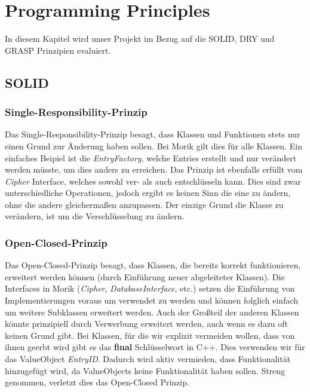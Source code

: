 \chapter{Programming Principles}

In diesem Kapitel wird unser Projekt im Bezug auf die SOLID, DRY und GRASP Prinzipien evaluiert.

\section{SOLID}

\subsection{Single-Responsibility-Prinzip}

Das Single-Responsibility-Prinzip besagt, dass Klassen und Funktionen stets nur einen Grund zur Änderung haben sollen. Bei Morik gilt dies für alle Klassen. Ein einfaches Beipiel ist die \textit{EntryFactory}, welche Entries erstellt und nur verändert werden müsste, um dies anders zu erreichen. Das Prinzip ist ebenfalls erfüllt vom \textit{Cipher} Interface, welches sowohl ver- als auch entschlüsseln kann. Dies sind zwar unterschiedliche Operationen, jedoch ergibt es keinen Sinn die eine zu ändern, ohne die andere gleichermaßen anzupassen. Der einzige Grund die Klasse zu verändern, ist um die Verschlüsselung zu ändern.

\subsection{Open-Closed-Prinzip}

Das Open-Closed-Prinzip besagt, dass Klassen, die bereits korrekt funktionieren, erweitert werden können (durch Einführung neuer abgeleiteter Klassen). 
Die Interfaces in Morik (\textit{Cipher}, \textit{DatabaseInterface}, etc.) setzen die Einführung von Implementierungen voraus um verwendet zu werden und können folglich einfach um weitere Subklassen erweitert werden. Auch der Großteil der anderen Klassen könnte prinzipiell durch Verwerbung erweitert werden, auch wenn es dazu oft keinen Grund gibt. Bei Klassen, für die wir explizit vermeiden wollen, dass von ihnen geerbt wird gibt es das \textbf{final} Schlüsselwort in C++. Dies verwenden wir \zB für das ValueObject \textit{EntryID}. Dadurch wird aktiv vermieden, dass Funktionalität hinzugefügt wird, da ValueObjects keine Funktionalität haben sollen. Streng genommen, verletzt dies das Open-Closed Prinzip.

